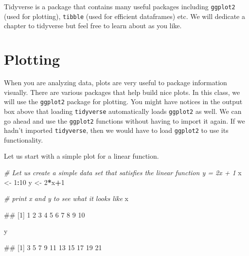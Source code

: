 \documentclass[
]{book}
\newenvironment{Shaded}{\begin{snugshade}}{\end{snugshade}}
\newcommand{\CommentTok}[1]{\textcolor[rgb]{0.56,0.35,0.01}{\textit{#1}}}
\newcommand{\DecValTok}[1]{\textcolor[rgb]{0.00,0.00,0.81}{#1}}
\newcommand{\NormalTok}[1]{#1}
\newcommand{\OtherTok}[1]{\textcolor[rgb]{0.56,0.35,0.01}{#1}}
\newcommand{\SpecialCharTok}[1]{\textcolor[rgb]{0.81,0.36,0.00}{\textbf{#1}}}
\begin{document}
Tidyverse is a package that contains many useful packages including \texttt{ggplot2} (used for plotting), \texttt{tibble} (used for efficient dataframes) etc. We will dedicate a chapter to tidyverse but feel free to learn about as you like.

\section{Plotting}\label{plotting}

When you are analyzing data, plots are very useful to package information visually. There are various packages that help build nice plots. In this class, we will use the \texttt{ggplot2} package for plotting. You might have notices in the output box above that loading \texttt{tidyverse} automatically loads \texttt{ggplot2} as well. We can go ahead and use the \texttt{ggplot2} functions without having to import it again. If we hadn't imported \texttt{tidyverse}, then we would have to load \texttt{ggplot2} to use its functionality.

Let us start with a simple plot for a linear function.

\begin{Shaded}
\begin{Highlighting}[]
\CommentTok{\# Let us create a simple data set that satisfies the linear function y = 2x + 1}
\NormalTok{x }\OtherTok{\textless{}{-}} \DecValTok{1}\SpecialCharTok{:}\DecValTok{10}
\NormalTok{y }\OtherTok{\textless{}{-}} \DecValTok{2}\SpecialCharTok{*}\NormalTok{x}\SpecialCharTok{+}\DecValTok{1}

\CommentTok{\# print x and y to see what it looks like}
\NormalTok{x}
\end{Highlighting}
\end{Shaded}

\begin{Shaded}
\begin{Highlighting}[]
\NormalTok{\#\#  [1]  1  2  3  4  5  6  7  8  9 10}
\end{Highlighting}
\end{Shaded}

\begin{Shaded}
\begin{Highlighting}[]
\NormalTok{y}
\end{Highlighting}
\end{Shaded}

\begin{Shaded}
\begin{Highlighting}[]
\NormalTok{\#\#  [1]  3  5  7  9 11 13 15 17 19 21}
\end{Highlighting}
\end{Shaded}
\end{document}
